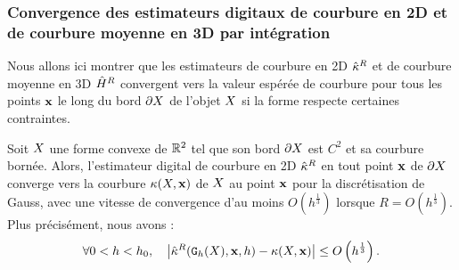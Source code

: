 \subsubsection{Convergence des estimateurs digitaux de courbure en 2D et de courbure moyenne en 3D par intégration}
%
Nous allons ici montrer que les estimateurs de courbure en 2D $\hat{\kappa}^{R}$ et de
courbure moyenne en 3D $\hat{H}^{R}$ convergent vers la valeur espérée de
courbure pour tous les points $\mathbf{x}$ le long du bord $\partial X$ de l'objet $X$ si
la forme respecte certaines contraintes.\\
%
\begin{theorem}{}
  \label{thm:convergence-curv-2d}
  Soit $X$ une forme convexe de $\mathbb{R}^2$ tel que son bord $\partial X$ est $C^2$ et
  sa courbure bornée. Alors, l'estimateur digital de courbure en 2D $\hat{\kappa}^{R}$ en
  tout point $\mathbf{x}$ de $\partial X$ converge vers la courbure
  $\kappa(X,\mathbf{x})$ de $X$ au point $\mathbf{x}$ pour la discrétisation de
  Gauss, avec une vitesse de convergence d'au moins $O(h^{\frac{1}{3}})$ lorsque
  $R = O(h^{\frac{1}{3}})$. Plus précisément, nous avons :
  \begin{equation}
    \forall 0 < h < h_0,
    \quad \left | \CurvH{R}(\DSh, \vx, h) - \Curv(\Shape, \vx) \right|
                          \le O \left(h^{\frac{1}{3}}\right). %
  \end{equation}
\end{theorem}

